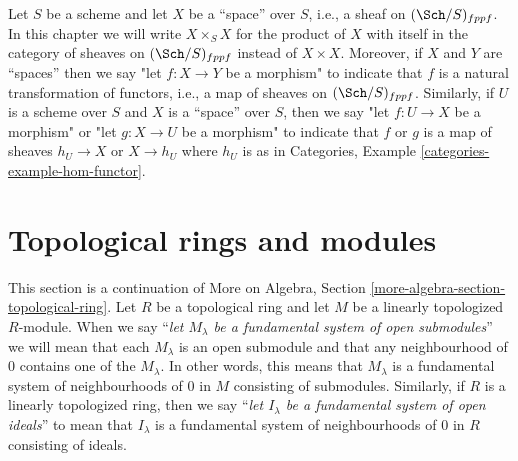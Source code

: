 \medskip\noindent
Let $S$ be a scheme and let $X$ be a ``space'' over $S$, i.e., a sheaf on
$(\Sch/S)_{fppf}$. In this chapter we will write $X \times_S X$ for the
product of $X$ with itself in the category of sheaves on $(\Sch/S)_{fppf}$
instead of $X \times X$. Moreover, if $X$ and $Y$ are ``spaces'' then
we say "let $f : X \to Y$ be a morphism" to indicate that $f$ is a
natural transformation of functors, i.e., a map of sheaves on
$(\Sch/S)_{fppf}$. Similarly, if $U$ is a scheme over $S$ and
$X$ is a ``space'' over $S$, then we say
"let $f : U \to X$ be a morphism" or
"let $g : X \to U$ be a morphism" to indicate that $f$ or $g$
is a map of sheaves $h_U \to X$ or $X \to h_U$ where $h_U$ is as in
Categories, Example \ref{categories-example-hom-functor}.

\section{Topological rings and modules}
\label{formal-spaces-section-topological-module}
This section is a continuation of
More on Algebra, Section \ref{more-algebra-section-topological-ring}.
Let $R$ be a topological ring and let $M$ be a linearly topologized
$R$-module. When we say ``{\it let $M_\lambda$ be a fundamental system of
open submodules}'' we will mean that each $M_\lambda$ is an open submodule
and that any neighbourhood of $0$ contains one of the $M_\lambda$.
In other words, this means that $M_\lambda$ is a fundamental system
of neighbourhoods of $0$ in $M$ consisting of submodules.
Similarly, if $R$ is a linearly topologized ring, then we say
``{\it let $I_\lambda$ be a fundamental system of open ideals}''
to mean that $I_\lambda$ is a fundamental system
of neighbourhoods of $0$ in $R$ consisting of ideals.

